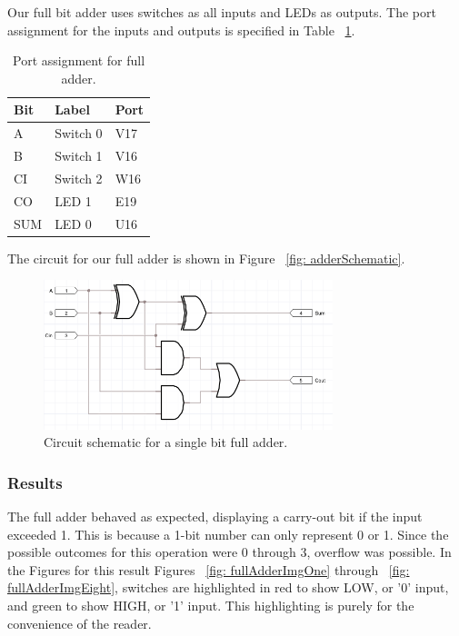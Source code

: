 \documentclass[11pt]{article}
\begin{document}
Our full bit adder uses switches as all inputs and LEDs as outputs. The port assignment for the inputs and outputs is specified in Table ~\ref{tab:fullAddPorts}.

\begin{table}[h]
\begin{center}
	\begin{tabular}{| l | l | l |}
		\hline
		Bit & Label & Port \\ \hline
		A & Switch 0 & V17 \\ \hline
		B & Switch 1 & V16 \\ \hline
		CI & Switch 2 & W16 \\ \hline
		CO & LED 1 & E19 \\ \hline
		SUM & LED 0 & U16 \\ \hline
	\end{tabular}
	\caption{\label{tab:fullAddPorts}Port assignment for full adder.}
	\label{tab:fullAddPorts}
\end{center}	
\end{table}

The circuit for our full adder is shown in Figure ~\ref{fig: adderSchematic}.

\begin{figure}[H]
\begin{center}
	\includegraphics[width=0.75\textwidth]{report-images/img4.png}
	\caption{\label{fig: adderSchematic} Circuit schematic for a single bit full adder.}
	\label{fig:adderSchematic}
\end{center}
\end{figure}

\subsubsection{Results}

The full adder behaved as expected, displaying a carry-out bit if the input exceeded 1. This is because a 1-bit number can only represent 0 or 1. Since the possible outcomes for this operation were 0 through 3, overflow was possible. In the Figures for this result Figures ~\ref{fig: fullAdderImgOne} through ~\ref{fig: fullAdderImgEight}, switches are highlighted in red to show LOW, or '0' input, and green to show HIGH, or '1' input. This highlighting is purely for the convenience of the reader.
\end{document}
